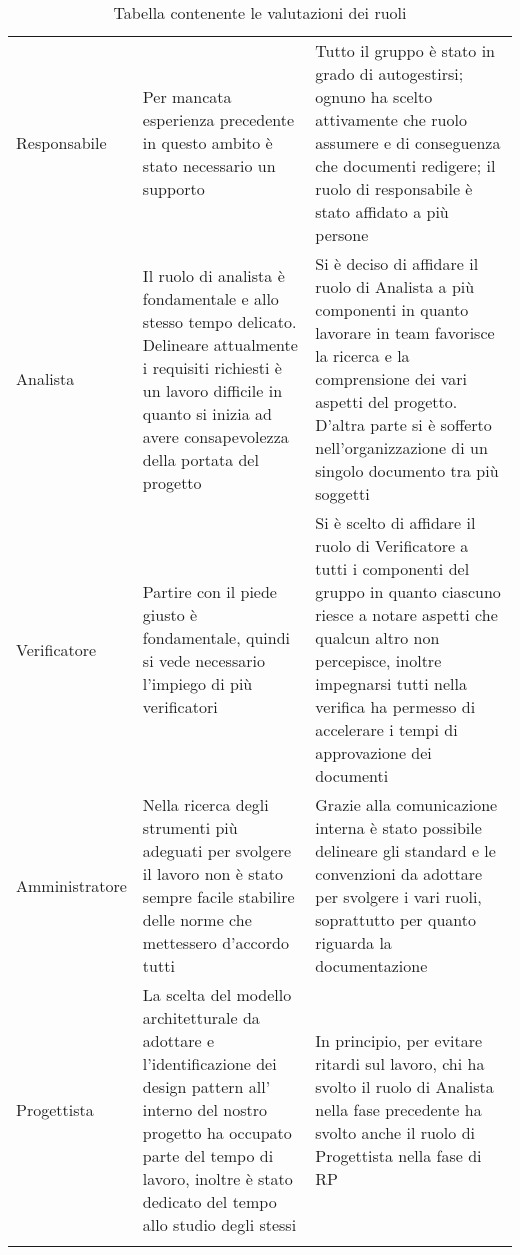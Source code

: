 \documentclass[../piano_di_qualifica.tex]{subfiles}
\begin{document}
\begin{center}
\begin{longtable}{|p{2.5cm}|p{7cm}|p{7cm}|}
		Responsabile   & Per mancata esperienza precedente in questo ambito è stato necessario un supporto                                                                                                                          & Tutto il gruppo è stato in grado di autogestirsi; ognuno ha scelto attivamente che ruolo assumere e di conseguenza che documenti redigere; il ruolo di responsabile è stato affidato a più persone                                                                    \\
		Analista       & Il ruolo di analista è fondamentale e allo stesso tempo delicato. Delineare attualmente i requisiti richiesti è un lavoro difficile in quanto si inizia ad avere consapevolezza della portata del progetto & Si è deciso di affidare il ruolo di Analista a più componenti in quanto lavorare in team favorisce la ricerca e la comprensione dei vari aspetti del progetto. D'altra parte si è sofferto nell'organizzazione di un singolo documento tra più soggetti               \\
		Verificatore   & Partire con il piede giusto è fondamentale, quindi si vede necessario l'impiego di più verificatori                                                                                                        & Si è scelto di affidare il ruolo di Verificatore a tutti i componenti del gruppo in quanto ciascuno riesce a notare aspetti che qualcun altro non percepisce, inoltre impegnarsi tutti nella verifica ha permesso di accelerare i tempi di approvazione dei documenti \\
		Amministratore & Nella ricerca degli strumenti più adeguati per svolgere il lavoro non è stato sempre facile stabilire delle norme che mettessero d'accordo tutti                                                           & Grazie alla comunicazione interna è stato possibile delineare gli standard e le convenzioni da adottare per svolgere i vari ruoli, soprattutto per quanto riguarda la documentazione                                                                                  \\
		Progettista	   & La scelta del modello architetturale da adottare e l'identificazione dei design pattern all' interno del nostro progetto ha occupato parte del tempo di lavoro, inoltre è stato dedicato del tempo allo studio degli stessi & In principio, per evitare ritardi sul lavoro, chi ha svolto il ruolo di Analista nella fase precedente ha svolto anche il ruolo di Progettista nella fase di RP \\
		\hline
		\rowcolor{white}
		\caption{Tabella contenente le valutazioni dei ruoli }
	\end{longtable}
\end{center}
\end{document}
